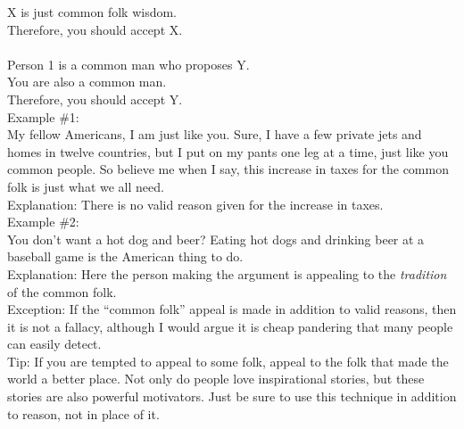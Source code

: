 \documentclass[a4paper,12pt,single,pdftex]{scrbook}
\begin{document}
    
      X is just common folk wisdom.
    \\

    
      Therefore, you should accept X.
    \\

    
       
    \\

    
      Person 1 is a common man who proposes Y.
    \\

    
      You are also a common man.
    \\

    
      Therefore, you should accept Y.
    \\

    
      Example \#1:
    \\

    
      My fellow Americans, I am just like you.  Sure, I have a few private jets and homes in twelve countries, but I put on my pants one leg at a time, just like you common people.  So believe me when I say, this increase in taxes for the common folk is just what we all need.
    \\

    
      Explanation: There is no valid reason given for the increase in taxes.
    \\

    
      Example \#2:
    \\

    
      You don't want a hot dog and beer?  Eating hot dogs and drinking beer at a baseball game is the American thing to do.
    \\

    
      Explanation: Here the person making the argument is appealing to the {\it tradition} of the common folk.
    \\

    
      Exception: If the “common folk” appeal is made in addition to valid reasons, then it is not a fallacy, although I would argue it is cheap pandering that many people can easily detect.
    \\

    
      Tip: If you are tempted to appeal to some folk, appeal to the folk that made the world a better place. Not only do people love inspirational stories, but these stories are also powerful motivators. Just be sure to use this technique in addition to reason, not in place of it.
    \\
\end{document}

